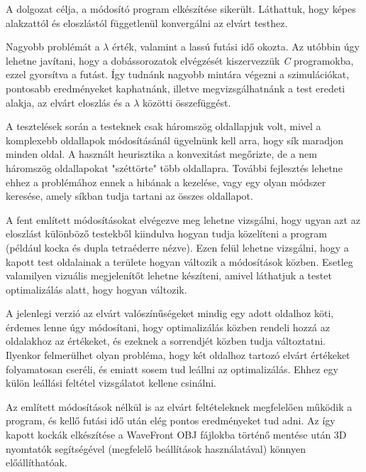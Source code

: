 
A dolgozat célja, a módosító program elkészítése sikerült.
Láthattuk, hogy képes alakzattól és eloszlástól függetlenül konvergálni az elvárt testhez.

Nagyobb problémát a $\lambda$ érték, valamint a lassú futási idő okozta.
Az utóbbin úgy lehetne javítani, hogy a dobássorozatok elvégzését kiszervezzük \textit{C} programokba, ezzel gyorsítva a futást.
Így tudnánk nagyobb mintára végezni a szimulációkat, pontosabb eredményeket kaphatnánk, illetve megvizsgálhatnánk a test eredeti alakja, az elvárt eloszlás és a $\lambda$ közötti összefüggést.

A tesztelések során a testeknek csak háromszög oldallapjuk volt, mivel a komplexebb oldallapok módosításánál ügyelnünk kell arra, hogy sík maradjon minden oldal.
A használt heurisztika a konvexitást megőrizte, de a nem háromszög oldallapokat "széttörte" több oldallapra.
További fejlesztés lehetne ehhez a problémához ennek a hibának a kezelése, vagy egy olyan módszer keresése, amely síkban tudja tartani az összes oldallapot.

A fent említett módosításokat elvégezve meg lehetne vizsgálni, hogy ugyan azt az eloszlást különböző testekből kiindulva hogyan tudja közelíteni a program (például kocka és dupla tetraéderre nézve).
Ezen felül lehetne vizsgálni, hogy a kapott test oldalainak a területe hogyan változik a módosítások közben.
Esetleg valamilyen vizuális megjelenítőt lehetne készíteni, amivel láthatjuk a testet optimalizálás alatt, hogy hogyan változik.

A jelenlegi verzió az elvárt valószínűségeket mindig egy adott oldalhoz köti, érdemes lenne úgy módosítani, hogy optimalizálás közben rendeli hozzá az oldalakhoz az értékeket, és ezeknek a sorrendjét közben tudja változtatni.
Ilyenkor felmerülhet olyan probléma, hogy két oldalhoz tartozó elvárt értékeket folyamatosan cseréli, és emiatt sosem tud leállni az optimalizálás.
Ehhez egy külön leállási feltétel vizsgálatot kellene csinálni.

Az említett módosítások nélkül is az elvárt feltételeknek megfelelően működik a program, és kellő futási idő után elég pontos eredményeket tud adni.
Az így kapott kockák elkészítése a WaveFront OBJ fájlokba történő mentése után 3D nyomtatók segítségével (megfelelő beállítások használatával) könnyen előállíthatóak.